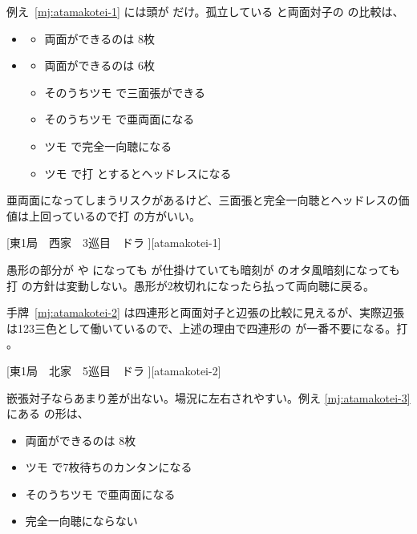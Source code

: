 \documentclass[../nankiru_main.tex]{subfiles}
\begin{document}
例え~\ref{mj:atamakotei-1} には頭が  だけ。孤立している  と両面対子の  の比較は、

\begin{itemize}
  \item {}
  \begin{itemize}
    \item[$\bigcirc$] 両面ができるのは  8枚
  \end{itemize}
  \item {}
  \begin{itemize}
    \item[$\times$] 両面ができるのは  6枚
    \item[$\bigcirc$] そのうちツモ  で三面張ができる
    \item[$\times$] そのうちツモ  で亜両面になる
    \item[$\bigcirc$] ツモ  で完全一向聴になる
    \item[$\bigcirc$] ツモ  で打  とするとヘッドレスになる
  \end{itemize}
\end{itemize}

亜両面になってしまうリスクがあるけど、三面張と完全一向聴とヘッドレスの価値は上回っているので打  の方がいい。

[東1局　西家　3巡目　ドラ ][atamakotei-1]

愚形の部分が  や  になっても  が仕掛けていても暗刻が  のオタ風暗刻になっても打  の方針は変動しない。愚形が2枚切れになったら払って両向聴に戻る。

手牌~\ref{mj:atamakotei-2} は四連形と両面対子と辺張の比較に見えるが、実際辺張は123三色として働いているので、上述の理由で四連形の  が一番不要になる。打  \citep{yuusee-floater}。

[東1局　北家　5巡目　ドラ ][atamakotei-2]

嵌張対子ならあまり差が出ない。場況に左右されやすい。例え \ref{mj:atamakotei-3} にある  の形は、

\begin{itemize}
  \item[$\bigtriangleup$] 両面ができるのは  8枚
  \item[$\bigcirc$] ツモ  で7枚待ちのカンタンになる
  \item[$\times$] そのうちツモ  で亜両面になる
  \item[$\bigtriangleup$] 完全一向聴にならない
\end{itemize}
\end{document}
